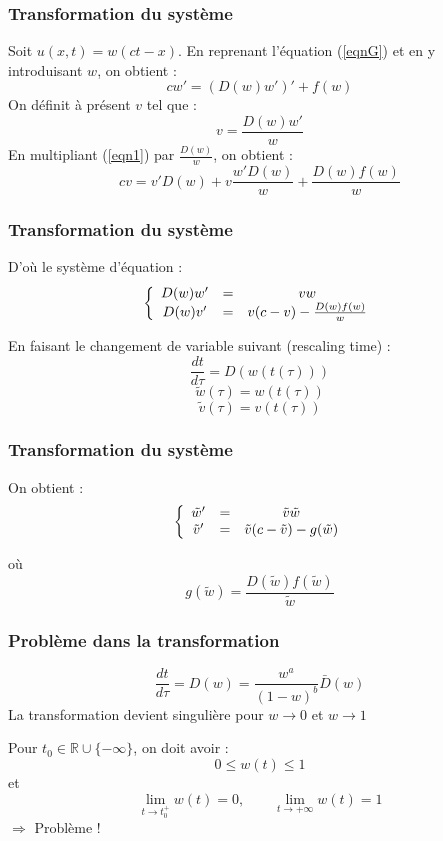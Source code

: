 \documentclass[handout]{beamer}
\begin{document}
\begin{frame}
	\frametitle{Transformation du système}
	Soit $u(x,t)=w(ct-x)$. En reprenant l'équation (\ref{eqnG}) et en y introduisant $w$, on obtient : \begin{equation} \label{eqn1} cw'=(D(w)w')'+f(w) \end{equation}
	On définit à présent $v$ tel que : \[v=\frac{D(w)w'}{w}\]
	En multipliant (\ref{eqn1}) par $\frac{D(w)}{w}$, on obtient : \[cv=v'D(w)+v\frac{w'D(w)}{w}+\frac{D(w)f(w)}{w}\]
\end{frame}

\begin{frame}
	\frametitle{Transformation du système}
D'où le système d'équation : \begin{equation} \label{eqn2} \left\{ \begin{array}{c c c}
	D(w)w' &=& vw \\
	D(w)v' &=& v(c-v)-\frac{D(w)f(w)}{w}
\end{array} \right. \end{equation}

En faisant le changement de variable suivant (rescaling time) : \[\frac{dt}{d\tau}=D(w(t(\tau)))\] \[\tilde{w}(\tau)=w(t(\tau))\] \[\tilde{v}(\tau)=v(t(\tau))\]
\end{frame}

\begin{frame}
	\frametitle{Transformation du système}
On obtient : 
\begin{equation} \left\{ \begin{array}{c c c}
	\tilde{w}' &=& \tilde{v}\tilde{w} \\
	\tilde{v}' &=& \tilde{v}(c-\tilde{v})-g(\tilde{w})
\end{array} \right. \end{equation}

où \[g(\tilde{w})=\frac{D(\tilde{w})f(\tilde{w})}{\tilde{w}}\]
\end{frame}

\begin{frame}
	\frametitle{Problème dans la transformation}
\[\frac{dt}{d\tau}=D(w)=\frac{w^a}{(1-w)^b}\bar{D}(w)\]
La transformation devient singulière pour $w\to 0$ et $w\to 1$

\bigskip
Pour $t_0\in \mathbb{R}\cup\{-\infty\}$, on doit avoir : \[0\leq w(t)\leq 1\] et \[\lim_{t\to t_0^+} w(t)=0, \hspace{2em} \lim_{t\to +\infty}w(t)=1\]
$\Rightarrow$ Problème !
\end{frame}
\end{document}
